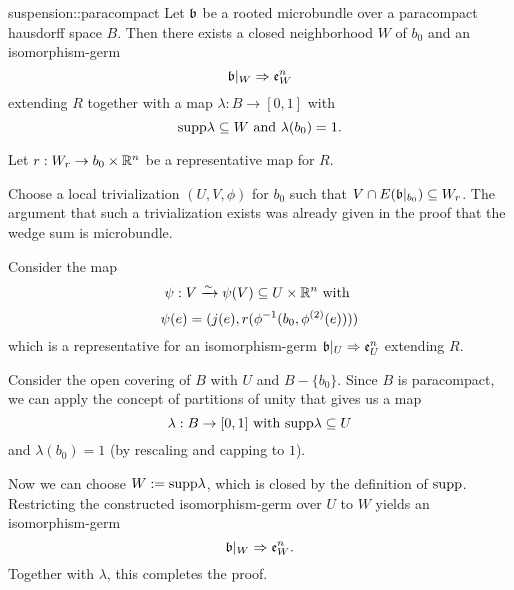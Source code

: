 \begin{mylemma}{suspension::paracompact}{}
    Let $\mathfrak{b}$ be a rooted microbundle over a paracompact hausdorff space $B$.
    Then there exists a closed neighborhood $W$ of $b_0$ and an isomorphism-germ
    \[ \mathfrak{b}\vert_{W} \Rightarrow{} \mathfrak{e}^{n}_{W} \]
    extending $R$ together with a map $\lambda: B \to [0, 1]$ with
    \[ \text{supp}{\lambda} \subseteq{} W \text{ and } \lambda(b_0) = 1. \]
\end{mylemma}

\begin{myproof}
    Let $r: W_r \to b_0 \times \mathbb{R}^n$ be a representative map for $R$.
    
    Choose a local trivialization $(U, V, \phi)$ for $b_0$ such that $V \cap E(\mathfrak{b}\vert_{b_0}) \subseteq{} W_r$.
    The argument that such a trivialization exists was already given
    in the proof that the wedge sum is microbundle.

    Consider the map
    \[ \psi: V \xrightarrow{\sim} \psi(V) \subseteq{} U \times \mathbb{R}^n \text{ with } \]
    \[ \psi(e) = (j(e), r(\phi^{-1}(b_0, \phi^{(2)}(e)))) \]
    which is a representative for an isomorphism-germ $\mathfrak{b}\vert_{U} \Rightarrow{} \mathfrak{e}^{n}_{U}$ extending $R$.
    
    Consider the open covering of $B$ with $U$ and $B - \{b_0\}$.
    Since $B$ is paracompact, we can apply the concept
    of partitions of unity that gives us a map
    \[ \lambda: B \to [0, 1] \text{ with } \text{supp}{\lambda} \subseteq{} U \]
    and $\lambda(b_0) = 1$ (by rescaling and capping to $1$).

    Now we can choose $W := \text{supp}{\lambda}$, which is closed by the definition of $\text{supp}$.
    Restricting the constructed isomorphism-germ over $U$ to $W$
    yields an isomorphism-germ
    \[ \mathfrak{b}\vert_{W} \Rightarrow{} \mathfrak{e}^{n}_{W}. \]
    Together with $\lambda$, this completes the proof.
\end{myproof}
